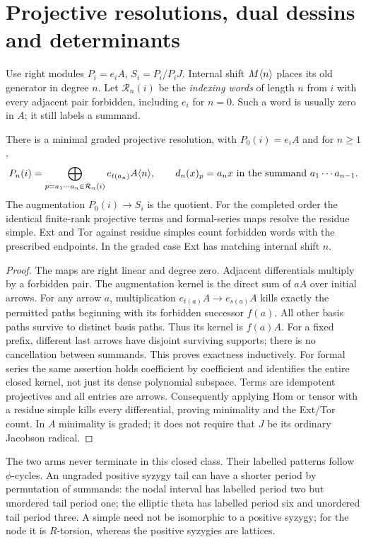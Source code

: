 \chapter{Projective resolutions, dual dessins and determinants}
Use right modules $P_i=e_iA$, $S_i=P_i/P_iJ$. Internal shift $M\langle n\rangle$ places its old generator in degree $n$. Let $\mathcal R_n(i)$ be the \emph{indexing words} of length $n$ from $i$ with every adjacent pair forbidden, including $e_i$ for $n=0$. Such a word is usually zero in $A$; it still labels a summand.
\begin{theorem}\label{thm:resolution}
There is a minimal graded projective resolution, with $P_0(i)=e_iA$ and for $n\ge1$,
\[
 P_n(i)=\bigoplus_{p=a_1\cdots a_n\in\mathcal R_n(i)}
 e_{t(a_n)}A\langle n\rangle,\qquad
 d_n(x)_p=a_nx\ \text{in the summand }a_1\cdots a_{n-1}.
\]
The augmentation $P_0(i)\to S_i$ is the quotient. For the completed order the identical finite-rank projective terms and formal-series maps resolve the residue simple. Ext and Tor against residue simples count forbidden words with the prescribed endpoints. In the graded case Ext has matching internal shift $n$.
\end{theorem}
\begin{proof}
The maps are right linear and degree zero. Adjacent differentials multiply by a forbidden pair. The augmentation kernel is the direct sum of $aA$ over initial arrows. For any arrow $a$, multiplication $e_{t(a)}A\to e_{s(a)}A$ kills exactly the permitted paths beginning with its forbidden successor $f(a)$. All other basis paths survive to distinct basis paths. Thus its kernel is $f(a)A$. For a fixed prefix, different last arrows have disjoint surviving supports; there is no cancellation between summands. This proves exactness inductively. For formal series the same assertion holds coefficient by coefficient and identifies the entire closed kernel, not just its dense polynomial subspace. Terms are idempotent projectives and all entries are arrows. Consequently applying Hom or tensor with a residue simple kills every differential, proving minimality and the Ext/Tor count. In $A$ minimality is graded; it does not require that $J$ be its ordinary Jacobson radical.
\end{proof}
The two arms never terminate in this closed class. Their labelled patterns follow $\phi$-cycles. An ungraded positive syzygy tail can have a shorter period by permutation of summands: the nodal interval has labelled period two but unordered tail period one; the elliptic theta has labelled period six and unordered tail period three. A simple need not be isomorphic to a positive syzygy; for the node it is $R$-torsion, whereas the positive syzygies are lattices.

